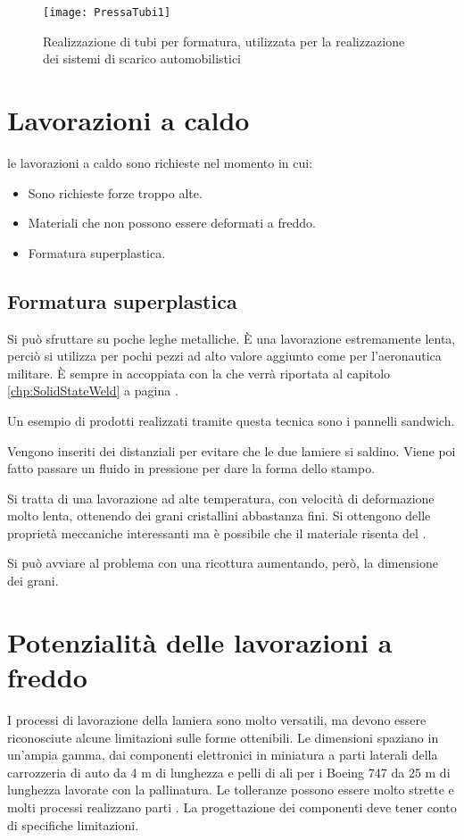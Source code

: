 \begin{figure}
\centering
\texttt{[image: PressaTubi1]}
\caption{Realizzazione di tubi per formatura, utilizzata per la realizzazione dei sistemi di scarico automobilistici}
\label{fig:PressaTubi1}
\end{figure}

\section{Lavorazioni a caldo}
le lavorazioni a caldo sono richieste nel momento in cui:
\begin{itemize}
\item Sono richieste forze troppo alte.
\item Materiali che non possono essere deformati a freddo.
\item Formatura superplastica.
\end{itemize}

\subsection{Formatura superplastica}
Si può sfruttare su poche leghe metalliche.
È una lavorazione estremamente lenta, perciò si utilizza per pochi pezzi ad alto valore aggiunto come per l'aeronautica militare.
È sempre in accoppiata con la  che verrà riportata al capitolo \ref{chp:SolidStateWeld} a pagina \pageref{chp:SolidStateWeld}.

Un esempio di prodotti realizzati tramite questa tecnica sono i pannelli sandwich.

Vengono inseriti dei distanziali per evitare che le due lamiere si saldino.
Viene poi fatto passare un fluido in pressione per dare la forma dello stampo.

Si tratta di una lavorazione ad alte temperatura, con velocità di deformazione molto lenta, ottenendo dei grani cristallini abbastanza fini.
Si ottengono delle proprietà meccaniche interessanti ma è possibile che il materiale risenta del .

Si può avviare al problema con una ricottura aumentando, però, la dimensione dei grani.

\section{Potenzialità delle lavorazioni a freddo}
I processi di lavorazione della lamiera sono molto versatili, ma devono essere riconosciute alcune limitazioni sulle forme ottenibili.
Le dimensioni spaziano in un'ampia gamma, dai componenti elettronici in miniatura a parti laterali della carrozzeria di auto da 4 m di lunghezza e pelli di ali per i Boeing 747 da 25 m di lunghezza lavorate con la pallinatura.
Le tolleranze possono essere molto strette e molti processi realizzano parti .
La progettazione dei componenti deve tener conto di specifiche limitazioni.

